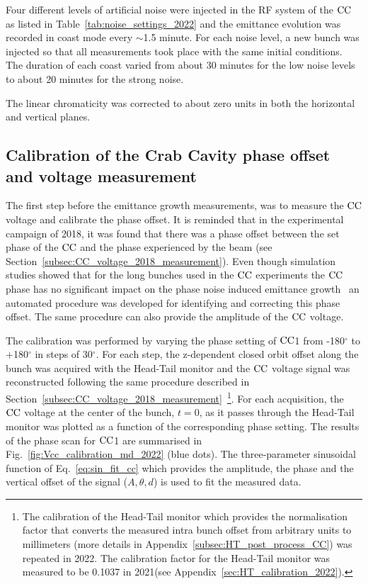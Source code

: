 Four different levels of artificial noise were injected in the RF system of the ${\mathrm{CC}}$ as listed in Table~\ref{tab:noise_settings_2022} and the emittance evolution was recorded in coast mode every $\sim$1.5 minute. For each noise level, a new bunch was injected so that all measurements took place with the same initial conditions. The duration of each coast varied from about 30 minutes for the low noise levels to about 20 minutes for the strong noise. 

The linear chromaticity was corrected to about zero units in both the horizontal and vertical planes. %

\subsection{Calibration of the Crab Cavity phase offset and voltage measurement}\label{subsec:cc_calibration_2022}

The first step before the emittance growth measurements, was to measure the ${\mathrm{CC}}$ voltage and calibrate the phase offset. It is reminded that in the experimental campaign of 2018, it was found that there was a phase offset between the set phase of the ${\mathrm{CC}}$ and the phase experienced by the beam (see Section~\ref{subsec:CC_voltage_2018_measurement}). Even though simulation studies showed that for the long bunches used in the ${\mathrm{CC}}$ experiments the ${\mathrm{CC}}$ phase has no significant impact on the phase noise induced emittance growth~\cite{wp4_triantafyllou_2020} an automated procedure was developed for identifying and correcting this phase offset. The same procedure can also provide the amplitude of the ${\mathrm{CC}}$ voltage.

The calibration was performed by varying the phase setting of ${\mathrm{CC}}$1 from -180$^\circ$ to +180$^\circ$ in steps of 30$^\circ$. For each step, the z-dependent closed orbit offset along the bunch was acquired with the Head-Tail monitor and the ${\mathrm{CC}}$ voltage signal was reconstructed following the same procedure described in Section~\ref{subsec:CC_voltage_2018_measurement}~\footnote{The calibration of the Head-Tail monitor which provides the normalisation factor that converts the measured intra bunch offset from arbitrary units to millimeters (more details in Appendix~\ref{subsec:HT_post_process_CC}) was repeated in 2022. The calibration factor for the Head-Tail monitor was measured to be 0.1037 in 2021(see Appendix~\ref{sec:HT_calibration_2022}).}. For each acquisition, the ${\mathrm{CC}}$ voltage at the center of the bunch, $t=0$, as it passes through the Head-Tail monitor was plotted as a function of the corresponding phase setting. The results of the phase scan for ${\mathrm{CC}}$1 are summarised in Fig.~\ref{fig:Vcc_calibration_md_2022} (blue dots). 
The three-parameter sinusoidal function of Eq.~\eqref{eq:sin_fit_cc} which provides the amplitude, the phase and the vertical offset of the signal ($A, \theta, d$) is used to fit the measured data.

